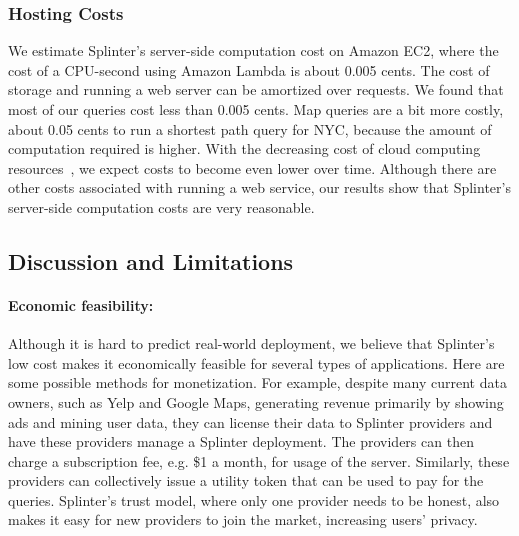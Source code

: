 \subsubsection{Hosting Costs}
\label{sec:pricing}
We estimate Splinter's server-side computation cost on Amazon EC2, 
where the cost of a CPU-second using Amazon Lambda is about 0.005 cents. 
The cost of storage and running a web server can be amortized over requests.
We found that most of our queries cost less than 0.005 cents. Map queries are a bit more costly,
about 0.05 cents to run a shortest path query for NYC, because the amount of 
computation required is higher. With the decreasing cost of cloud computing resources~\cite{decrease-aws},
we expect costs to become even lower over time. Although there are other costs associated with running a web service,
our results show that Splinter's server-side computation costs are very reasonable.


\subsection{Discussion and Limitations}
\label{spl-sec:discussion}

\paragraph{Economic feasibility:}
\label{sec:disc-economics}

Although it is hard to predict real-world deployment, we believe that Splinter's low cost makes it economically feasible for several types of applications.
Here are some possible methods for monetization.
For example, despite many current data owners, such as Yelp and Google Maps, generating revenue primarily by showing ads and mining user data,
they can license their data to Splinter providers and have these providers manage a Splinter deployment. The providers
can then charge a subscription fee, e.g. \$1 a month, for usage of the server.
Similarly, these providers can collectively issue a utility token that
can be used to pay for the queries.
Splinter's trust model, where only one provider needs to be honest, also makes 
it easy for new providers to join the market, increasing users' privacy.

